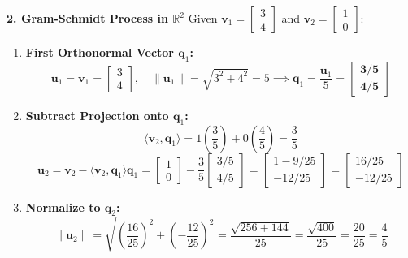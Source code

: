 \textbf{2. Gram-Schmidt Process in $\mathbb{R}^2$}
Given $\mathbf{v}_1 = \begin{bmatrix} 3 \\ 4 \end{bmatrix}$ and $\mathbf{v}_2 = \begin{bmatrix} 1 \\ 0 \end{bmatrix}$:
\begin{enumerate}
    \item \textbf{First Orthonormal Vector $\mathbf{q}_1$:}
    \begin{equation*}
    \mathbf{u}_1 = \mathbf{v}_1 = \begin{bmatrix} 3 \\ 4 \end{bmatrix}, \quad \|\mathbf{u}_1\| = \sqrt{3^2 + 4^2} = 5 \implies \mathbf{q}_1 = \frac{\mathbf{u}_1}{5} = \mathbf{\begin{bmatrix} 3/5 \\ 4/5 \end{bmatrix}}
    \end{equation*}
    \item \textbf{Subtract Projection onto $\mathbf{q}_1$:}
    \begin{equation*}
    \langle \mathbf{v}_2, \mathbf{q}_1 \rangle = 1\left(\frac{3}{5}\right) + 0\left(\frac{4}{5}\right) = \frac{3}{5}
    \end{equation*}
    \begin{equation*}
    \mathbf{u}_2 = \mathbf{v}_2 - \langle \mathbf{v}_2, \mathbf{q}_1 \rangle \mathbf{q}_1 = \begin{bmatrix} 1 \\ 0 \end{bmatrix} - \frac{3}{5} \begin{bmatrix} 3/5 \\ 4/5 \end{bmatrix} = \begin{bmatrix} 1 - 9/25 \\ -12/25 \end{bmatrix} = \begin{bmatrix} 16/25 \\ -12/25 \end{bmatrix}
    \end{equation*}
    \item \textbf{Normalize to $\mathbf{q}_2$:}
    \begin{equation*}
    \|\mathbf{u}_2\| = \sqrt{\left(\frac{16}{25}\right)^2 + \left(-\frac{12}{25}\right)^2} = \frac{\sqrt{256 + 144}}{25} = \frac{\sqrt{400}}{25} = \frac{20}{25} = \frac{4}{5}

\end{equation*}
\end{enumerate}
